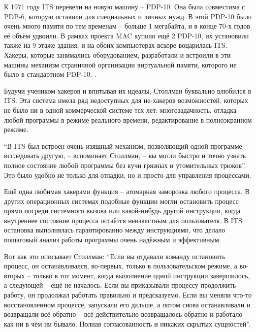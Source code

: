 К 1971 году ITS перевели на новую машину -- PDP-10. Она была совместима с PDP-6, которую оставили для специальных и личных нужд. В этой PDP-10 было очень много памяти по тем временам -- больше 1 мегабайта, и в конце 70-х годов её объём удвоили. В рамках проекта MAC купили ещё 2 PDP-10, их установили также на 9 этаже здания, и на обоих компьютерах вскоре воцарилась ITS. Хакеры, которые занимались оборудованием, разработали и встроили в эти машины механизм страничной организации виртуальной памяти, которого не было в стандартном PDP-10. .

Будучи учеником хакеров и впитывая их идеалы, Столлман буквально влюбился в ITS. Эта система имела ряд недоступных для не-хакеров возможностей, которых не было ни в одной коммерческой системе тех лет: многозадачность, отладка любой программы в режиме реального времени, редактирование в полноэкранном режиме.

\enquote{В ITS был встроен очень изящный механизм, позволяющий одной программе исследовать другую, -- вспоминает Столлман, -- вы могли быстро и точно узнать полное состояние любой программы без кучи грязных и утомительных трюков}. Это было удобно не только для отладки, но и просто для управления процессами.

Ещё одна любимая хакерами функция -- атомарная заморозка любого процесса. В других операционных системах подобные функции могли остановить процесс прямо посреди системного вызова или какой-нибудь другой инструкции, когда внутреннее состояние процесса остаётся неизвестным для пользователя. В ITS остановка выполнялась гарантированно между инструкциями, что делало пошаговый анализ работы программы очень надёжным и эффективным.

Вот как это описывает Столлман: \enquote{Если вы отдавали команду остановить процесс, он останавливался, во-первых, только в пользовательском режиме, а во-вторых -- только в тот момент, когда выполнение одной инструкции завершилось, а следующей -- ещё не началось. Если вы приказывали процессу продолжить работу, он продолжал работать правильно и предсказуемо. Если вы меняли что-то восстановленном процессе, запускали его дальше, а потом снова останавливали и возвращали всё обратно -- всё действительно возвращалось обратно и работало как ни в чём ни бывало. Полная согласованность и никаких скрытых сущностей}.

